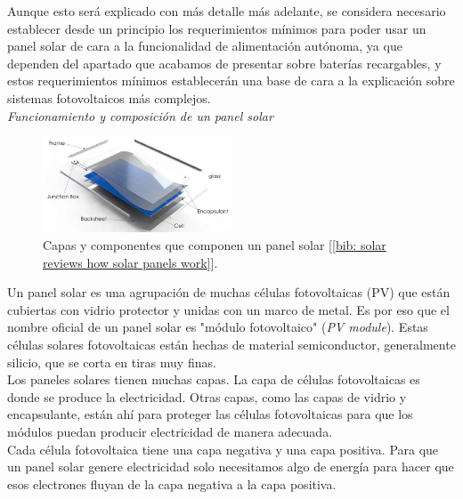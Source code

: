 \documentclass[12pt]{article}
\begin{document}
	\noindent Aunque esto será explicado con más detalle más adelante, se considera necesario establecer desde un principio los requerimientos mínimos para poder usar un panel solar de cara a la funcionalidad de alimentación autónoma, ya que dependen del apartado que acabamos de presentar sobre baterías recargables, y estos requerimientos mínimos establecerán una base de cara a la explicación sobre sistemas fotovoltaicos más complejos. \\
	
	\noindent \textit{Funcionamiento y composición de un panel solar}
	
	\begin{figure}[h!]
		\begin{center}
			\includegraphics[width=0.5\textwidth]{img/layersSolarPanel.png}
			\caption{Capas y componentes que componen un panel solar [\ref{bib: solar reviews how solar panels work}].}
			\label{fig: capas panel solar}
		\end{center}
	\end{figure}

	
	\noindent Un panel solar es una agrupación de muchas células fotovoltaicas (PV) que están cubiertas con vidrio protector y unidas con un marco de metal. Es por eso que el nombre oficial de un panel solar es "módulo fotovoltaico" (\textit{PV module}). Estas células solares fotovoltaicas están hechas de material semiconductor, generalmente silicio, que se corta en tiras muy finas.\\
	
	\noindent Los paneles solares tienen muchas capas. La capa de células fotovoltaicas es donde se produce la electricidad. Otras capas, como las capas de vidrio y encapsulante, están ahí para proteger las células fotovoltaicas para que los módulos puedan producir electricidad de manera adecuada.\\
	
	\noindent Cada célula fotovoltaica tiene una capa negativa y una capa positiva. Para que un panel solar genere electricidad solo necesitamos algo de energía para hacer que esos electrones fluyan de la capa negativa a la capa positiva. \\
	
\end{document}
